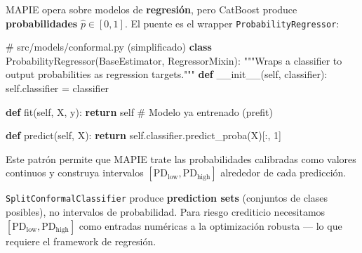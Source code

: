 \documentclass[
  spanish,
  11pt,
  letterpaper,
]{scrbook}
\newenvironment{Shaded}{\begin{snugshade}}{\end{snugshade}}
\newcommand{\CommentTok}[1]{\textcolor[rgb]{0.37,0.37,0.37}{#1}}
\newcommand{\ControlFlowTok}[1]{\textcolor[rgb]{0.00,0.23,0.31}{\textbf{#1}}}
\newcommand{\DecValTok}[1]{\textcolor[rgb]{0.68,0.00,0.00}{#1}}
\newcommand{\FunctionTok}[1]{\textcolor[rgb]{0.28,0.35,0.67}{#1}}
\newcommand{\KeywordTok}[1]{\textcolor[rgb]{0.00,0.23,0.31}{\textbf{#1}}}
\newcommand{\NormalTok}[1]{\textcolor[rgb]{0.00,0.23,0.31}{#1}}
\newcommand{\OperatorTok}[1]{\textcolor[rgb]{0.37,0.37,0.37}{#1}}
\newcommand{\VariableTok}[1]{\textcolor[rgb]{0.07,0.07,0.07}{#1}}
\theoremstyle{plain}
\theoremstyle{remark}
\begin{document}
MAPIE opera sobre modelos de \textbf{regresión}, pero CatBoost produce
\textbf{probabilidades} \(\hat{p} \in [0,1]\). El puente es el wrapper
\texttt{ProbabilityRegressor}:

\begin{Shaded}
\begin{Highlighting}[]
\CommentTok{\# src/models/conformal.py (simplificado)}
\KeywordTok{class}\NormalTok{ ProbabilityRegressor(BaseEstimator, RegressorMixin):}
    \CommentTok{"""Wraps a classifier to output probabilities as regression targets."""}
    \KeywordTok{def} \FunctionTok{\_\_init\_\_}\NormalTok{(}\VariableTok{self}\NormalTok{, classifier):}
        \VariableTok{self}\NormalTok{.classifier }\OperatorTok{=}\NormalTok{ classifier}

    \KeywordTok{def}\NormalTok{ fit(}\VariableTok{self}\NormalTok{, X, y):}
        \ControlFlowTok{return} \VariableTok{self}  \CommentTok{\# Modelo ya entrenado (prefit)}

    \KeywordTok{def}\NormalTok{ predict(}\VariableTok{self}\NormalTok{, X):}
        \ControlFlowTok{return} \VariableTok{self}\NormalTok{.classifier.predict\_proba(X)[:, }\DecValTok{1}\NormalTok{]}
\end{Highlighting}
\end{Shaded}

Este patrón permite que MAPIE trate las probabilidades calibradas como
valores continuos y construya intervalos
\([\text{PD}_\text{low}, \text{PD}_\text{high}]\) alrededor de cada
predicción.

\begin{tcolorbox}[enhanced jigsaw, arc=.35mm, bottomrule=.15mm, bottomtitle=1mm, breakable, colback=white, colbacktitle=quarto-callout-note-color!10!white, colframe=quarto-callout-note-color-frame, coltitle=black, left=2mm, leftrule=.75mm, opacityback=0, opacitybacktitle=0.6, rightrule=.15mm, title=\textcolor{quarto-callout-note-color}{\faInfo}\hspace{0.5em}{¿Por qué no usar SplitConformalClassifier?}, titlerule=0mm, toprule=.15mm, toptitle=1mm]

\texttt{SplitConformalClassifier} produce \textbf{prediction sets}
(conjuntos de clases posibles), no intervalos de probabilidad. Para
riesgo crediticio necesitamos
\([\text{PD}_\text{low}, \text{PD}_\text{high}]\) como entradas
numéricas a la optimización robusta --- lo que requiere el framework de
regresión.

\end{tcolorbox}
\end{document}
